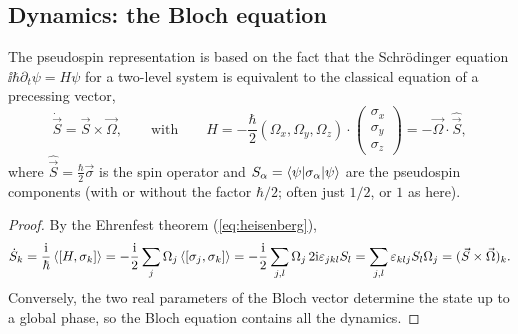 \subsection{Dynamics: the Bloch equation}
The pseudospin representation is based on the fact that the Schrödinger equation $\ii\hbar\partial_t\psi=H\psi$ for a two-level system is
equivalent to the classical equation of a precessing vector,
\begin{equation}\label{eq:precession}
  \dot{\vec S}=\vec S\times\vec\Omega,\qquad\text{with}\qquad
  H=-\frac\hbar2(\Omega_x,\Omega_y,\Omega_z)\cdot\begin{pmatrix}\sigma_x\\ \sigma_y\\ \sigma_z\end{pmatrix}=-\vec\Omega\cdot\hat{\vec S},
\end{equation}
where $\hat{\vec S}=\frac\hbar2\vec\sigma$ is the spin operator and $S_\alpha=\left\langle\psi\middle|\sigma_\alpha\middle|\psi\right\rangle$ are the pseudospin components
(with or without the factor $\hbar/2$; often just $1/2$, or $1$ as here).
\begin{proof}
By the Ehrenfest theorem (\cref{eq:heisenberg}),
\begin{equation*}
  \dot S_k=\frac{\mathrm i}\hbar\left\langle[H,\sigma_k]\right\rangle=-\frac{\mathrm i}2\sum_j\Omega_j\left\langle[\sigma_j,\sigma_k]\right\rangle
  =-\frac{\mathrm i}2\sum_{j,l}\Omega_j\,2\mathrm i\varepsilon_{jkl}S_l=\sum_{j,l}\varepsilon_{klj}S_l\Omega_j=(\vec S\times\vec\Omega)_k .
\end{equation*}
Conversely, the two real parameters of the Bloch vector determine the state up to a global phase, so the Bloch equation contains all the dynamics.
\end{proof}

